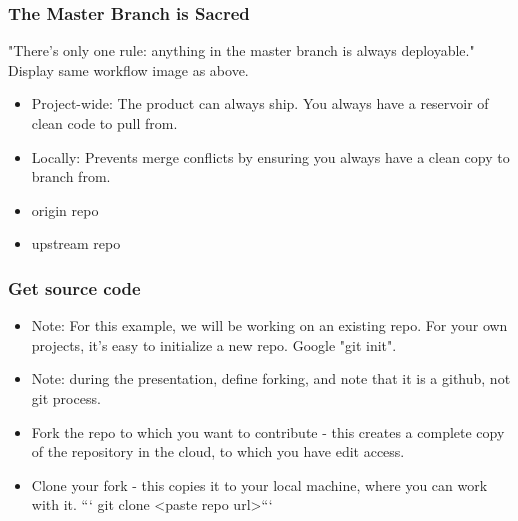 \documentclass[unknownkeysallowed]{beamer}
\begin{document}
\begin{frame}
    \frametitle{The Master Branch is Sacred}
    "There's only one rule: anything in the master branch is always deployable."
    Display same workflow image as above.
    \begin{itemize}
        \item{Project-wide: The product can always ship. You always have a reservoir of clean code to pull from.}
        \item{Locally: Prevents merge conflicts by ensuring you always have a clean copy to branch from.}
        \item{origin repo}
        \item{upstream repo}
    \end{itemize}
    \vspace{1cm} %
\end{frame}

\begin{frame}
    \frametitle{Get source code}
    \begin{itemize}
        \item{Note: For this example, we will be working on an existing repo. For your own projects, it's easy to initialize a new repo. Google "git init".}
        \item{Note: during the presentation, define forking, and note that it is a github, not git process.}
        \item{Fork the repo to which you want to contribute - this creates a complete copy of the repository in the cloud, to which you have edit access.}
        \item{Clone your fork - this copies it to your local machine, where you can work with it.  ``` git clone <paste repo url>```}
    \end{itemize}
    \vspace{1cm} %
\end{frame}
\end{document}
